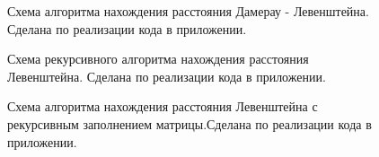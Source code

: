 \documentclass[a4paper]{article}
\begin{document}
	\begin{figure}[h]
		
		\caption{Схема алгоритма нахождения расстояния Дамерау - Левенштейна. Сделана по реализации кода в приложении. \centering}
		\label{image2}
	\end{figure}

	\begin{figure}[h]
		
		\caption{Схема рекурсивного алгоритма нахождения расстояния Левенштейна. Сделана по реализации кода в приложении. \centering}
		\label{image3}
	\end{figure}

	\begin{figure}[h]
	
	\caption{Схема алгоритма нахождения расстояния Левенштейна с рекурсивным заполнением матрицы.Сделана по реализации кода в приложении. \centering}
	\label{image4}
\end{figure}


	
	
\end{document}
